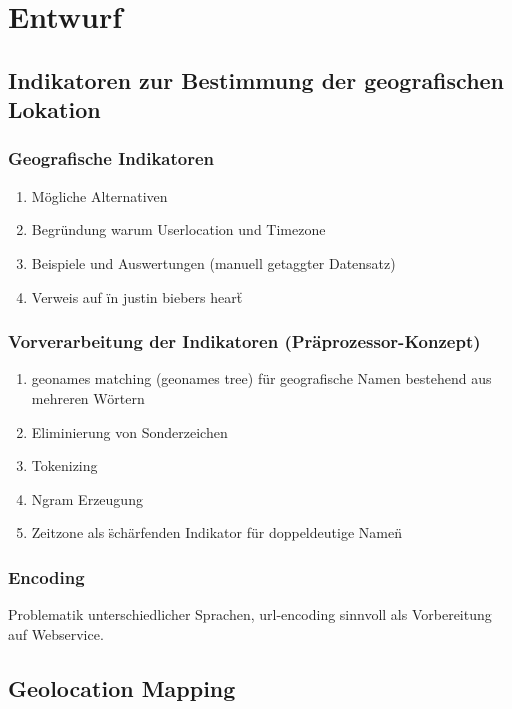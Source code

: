 \chapter{Entwurf} 

\section{Indikatoren zur Bestimmung der geografischen Lokation}

	\subsection{Geografische Indikatoren}
		\begin{enumerate}
			\item Mögliche Alternativen
			\item Begründung warum Userlocation und Timezone
			\item Beispiele und Auswertungen (manuell getaggter Datensatz)
			\item Verweis auf \"in justin biebers heart\"
		\end{enumerate}

	\subsection{Vorverarbeitung der Indikatoren (Präprozessor-Konzept)}
		\begin{enumerate}
			\item geonames matching (geonames tree) für geografische Namen bestehend aus mehreren Wörtern
			\item Eliminierung von Sonderzeichen
			\item Tokenizing
			\item Ngram Erzeugung
			\item {} Zeitzone als \"schärfenden Indikator für doppeldeutige Namen\"
		\end{enumerate}

	\subsection{Encoding}
		Problematik unterschiedlicher Sprachen, 
		url-encoding sinnvoll als Vorbereitung auf Webservice. 

\section{Geolocation Mapping}

